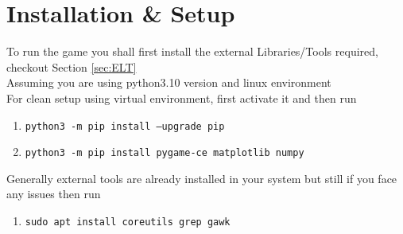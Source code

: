 \documentclass[12pt]{article}
\begin{document}
\section{Installation \& Setup}
To run the game you shall first install the external Libraries/Tools required, checkout Section \ref{sec:ELT} \\
Assuming you are using python3.10 version and linux environment \\
For clean setup using virtual environment, first activate it and then run
\begin{enumerate}
    \item  \texttt{python3 -m pip install --upgrade pip}
    \item  \texttt{python3 -m pip install pygame-ce matplotlib numpy} 
\end{enumerate}
Generally external tools are already installed in your system but still if you face any issues then run
\begin{enumerate}
    \item  \texttt{sudo apt install coreutils grep gawk}
\end{enumerate}
\end{document}
